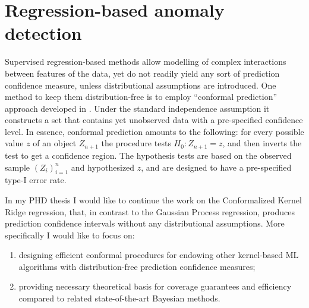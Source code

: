 \documentclass{extarticle}
\begin{document}

\section{Regression-based anomaly detection} %
\label{sec:regression_based_anomaly_detection}


Supervised regression-based methods allow modelling of complex interactions between
features of the data, yet do not readily yield any sort of prediction confidence
measure, unless distributional assumptions are introduced. One method to keep them
distribution-free is to employ ``conformal prediction'' approach developed in \cite{vovk2005}.
Under the standard independence assumption it constructs a set that contains yet
unobserved data with a pre-specified confidence level. In essence, conformal prediction
amounts to the following: for every possible value $z$ of an object $Z_{n+1}$ the
procedure tests $H_0: Z_{n+1}=z$, and then inverts the test to get a confidence
region. The hypothesis tests are based on the observed sample $(Z_i)_{i=1}^n$ and
hypothesized $z$, and are designed to have a pre-specified type-I error rate.

In my PHD thesis I would like to continue the work on the Conformalized Kernel Ridge
regression, that, in contrast to the Gaussian Process regression, produces prediction
confidence intervals without any distributional assumptions. More specifically I
would like to focus on: \begin{enumerate}
  \item designing efficient conformal procedures for endowing other kernel-based
  ML algorithms with distribution-free prediction confidence measures;
  \item providing necessary theoretical basis for coverage guarantees and efficiency
  compared to related state-of-the-art Bayesian methods.
\end{enumerate}
\end{document}
